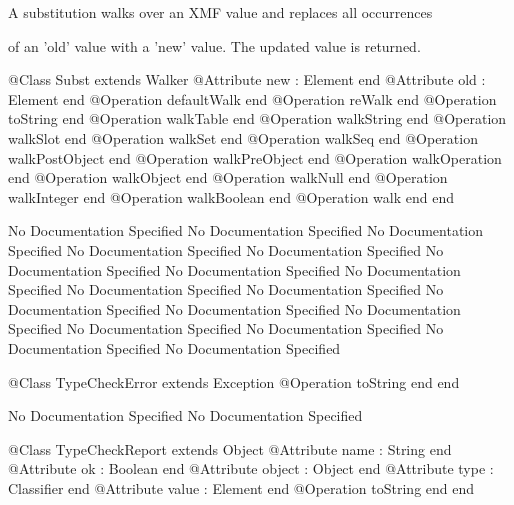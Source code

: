       A substitution walks over an XMF value and replaces all occurrences

      of an 'old' value with a 'new' value. The updated value is returned.
\begin{Interface}
@Class Subst extends Walker
  @Attribute new : Element end
  @Attribute old : Element end
  @Operation defaultWalk end
  @Operation reWalk end
  @Operation toString end
  @Operation walkTable end
  @Operation walkString end
  @Operation walkSlot end
  @Operation walkSet end
  @Operation walkSeq end
  @Operation walkPostObject end
  @Operation walkPreObject end
  @Operation walkOperation end
  @Operation walkObject end
  @Operation walkNull end
  @Operation walkInteger end
  @Operation walkBoolean end
  @Operation walk end
end
\end{Interface}
No Documentation Specified
No Documentation Specified
No Documentation Specified
No Documentation Specified
No Documentation Specified
No Documentation Specified
No Documentation Specified
No Documentation Specified
No Documentation Specified
No Documentation Specified
No Documentation Specified
No Documentation Specified
No Documentation Specified
No Documentation Specified
No Documentation Specified
No Documentation Specified
No Documentation Specified
\begin{Interface}
@Class TypeCheckError extends Exception
  @Operation toString end
end
\end{Interface}
No Documentation Specified
No Documentation Specified
\begin{Interface}
@Class TypeCheckReport extends Object
  @Attribute name : String end
  @Attribute ok : Boolean end
  @Attribute object : Object end
  @Attribute type : Classifier end
  @Attribute value : Element end
  @Operation toString end
end
\end{Interface}
